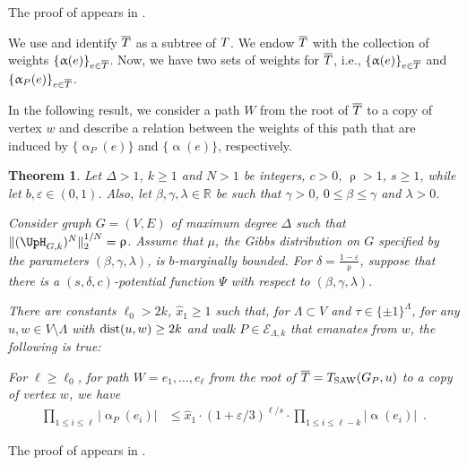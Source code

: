 \documentclass[11pt,reqno]{amsart}
\numberwithin{equation}{section}
\newtheorem{theorem}{Theorem}[section]
\newcommand{\cE}{{\mathcal{E}}}
\newcommand{\applegreen}[1]{ {\color{applegreen}#1}}
\newcommand{\blue}[1]{{\color{blue}#1}}
\newcommand{\bluepigment}[1]{{\color{blue(pigment)}#1}}
\newcommand{\capri}[1]{{\color{capri}#1}}
\newcommand{\cadmiumgreen}[1]{{\color{cadmiumgreen}#1}}
\newcommand{\darkmagenta}[1]{{\color{darkmagenta}#1}}
\newcommand{\deeppink}[1]{{\color{deeppink}#1}}
\newcommand{\goldenbrown}[1]{{\color{goldenbrown}#1}}
\newcommand{\iris}[1]{{\color{iris}#1}}
\newcommand{\red}[1]{{\color{red}#1}}
\newcommand{\dist}{{\rm dist}}
\newcommand{\maxDeg}{{\Delta}}
\newcommand{\ExtV}{\iris{\cE}}
\newcommand{\potF}{{\Psi}}
\newcommand{\pfs}{\darkmagenta{s}}
\newcommand{\Tsaw}{T_{\rm SAW}}
\newcommand{\nnorm}[3]{\goldenbrown{\|} #1\goldenbrown{\|}^{#2}_{#3}}
\newcommand{\abs}[1]{\blue{|}#1\blue{|}}
\newcommand{\NBMatrix}{\cadmiumgreen{\UpH}_{G,\kk}}
\renewcommand{\applegreen}[1]{#1}
\renewcommand{\blue}[1]{#1}
\renewcommand{\bluepigment}[1]{#1}
\renewcommand{\capri}[1]{#1}
\renewcommand{\cadmiumgreen}[1]{#1}
\renewcommand{\darkmagenta}[1]{#1}
\renewcommand{\deeppink}[1]{#1}
\renewcommand{\goldenbrown}[1]{#1}
\renewcommand{\iris}[1]{#1}
\renewcommand{\red}[1]{#1}
\newcommand{\kc}{\deeppink{c}}
\newcommand{\ke}{\blue{e}}
\newcommand{\ki}{\capri{i}}
\newcommand{\kk}{\bluepigment{k}}
\newcommand{\kell}{{\color{green(pigment)}\ell}}%
\newcommand{\kP}{\goldenbrown{P}}
\newcommand{\ku}{\red{u}}
\newcommand{\kW}{\blue{W}}
\newcommand{\kw}{\blue{w}}
\renewcommand{\kc}{x}
\renewcommand{\ke}{e}
\renewcommand{\ki}{i}
\renewcommand{\kk}{k}
\renewcommand{\kell}{\ell}
\renewcommand{\kP}{P}
\renewcommand{\ku}{u}
\renewcommand{\kW}{W}
\renewcommand{\kw}{w}
\newcommand{\infweight}{\upalpha}
\newcommand{\SingBound}{\uprho}
\begin{document}
The proof of  appears in . 




We use  and identify $\SMTPu$ as a subtree of $\SMTu$.
We endow $\SMTPu$ with the collection of weights
$\{ \infweight(\ke)\}_{\ke\in \SMTPu}$. 
Now, we have two sets of weights for $\SMTPu$, i.e., $\{\infweight(\ke)\}_{\ke\in \SMTPu}$ and
$\{\infweight_{\kP} (\ke)\}_{\ke\in \SMTPu}$. 
 

 In the following result,  we consider a path $\kW$ from the root of $\SMTPu$ to a copy of vertex $\kw$
and describe a relation between the weights of this path that are induced by $\{\infweight_{\kP}(\ke)\}$ and 
$\{\infweight(\ke)\}$, respectively. 




\begin{theorem}\label{thrm:ProdWideHatBetaVsBeta}
Let $\maxDeg > 1$, $\kk\geq 1$ and $N>1$ be integers, $c>0$, $\SingBound> 1$, $\pfs\geq 1$, while 
let $b,\varepsilon\in (0,1)$. Also, let $\beta,\gamma, \lambda\in \mathbb{R}$ be such that $\gamma >0$,
$0\leq \beta\leq \gamma$ and $\lambda>0$. 


Consider graph $G=(V,E)$ of maximum degree $\maxDeg$ such that $\nnorm{ (\NBMatrix)^N}{1/N}{2}= \SingBound$. 
Assume that $\mu$, the Gibbs distribution on $G$ specified by the parameters $(\beta, \gamma, \lambda)$,
is $b$-marginally bounded. For $\delta= \frac{1-\varepsilon}{\SingBound}$, suppose that there
is a $(\pfs,\delta,c)$-potential function $\potF$ with respect to $(\beta,\gamma,\lambda)$. 


There are constants $\ell_0> 2\kk$, $\widehat{\kc}_1\geq 1$ such that,  for $\Lambda\subset V$ and 
$\tau\in \{\pm 1\}^{\Lambda}$, for any $\ku,\kw\in V\setminus \Lambda$ with  $\dist(\ku,\kw)\geq 2\kk$ 
and walk $\kP\in \ExtV_{\Lambda,\kk}$ that emanates from $\kw$, the following is true:


For $\kell\geq \ell_0$, for path $\kW=\ke_1, \ldots, \ke_{\kell}$ from the root of $\SMTPu=\Tsaw(\gext{G}{\kP}, \ku)$ 
to a copy of vertex $\kw$, we have
\begin{align}\nonumber
\prod\nolimits_{1\leq \ki \leq \kell} \abs{\infweight_{\kP}(\ke_{\ki})} & \leq \widehat{\kc}_1 \cdot (1+\varepsilon/3)^{\kell/\pfs} \cdot \prod\nolimits_{1\leq \ki\leq \kell-\kk} \abs{\infweight (\ke_{\ki})} \enspace. 
\end{align}
\end{theorem}
The proof of  appears in .
\end{document}

